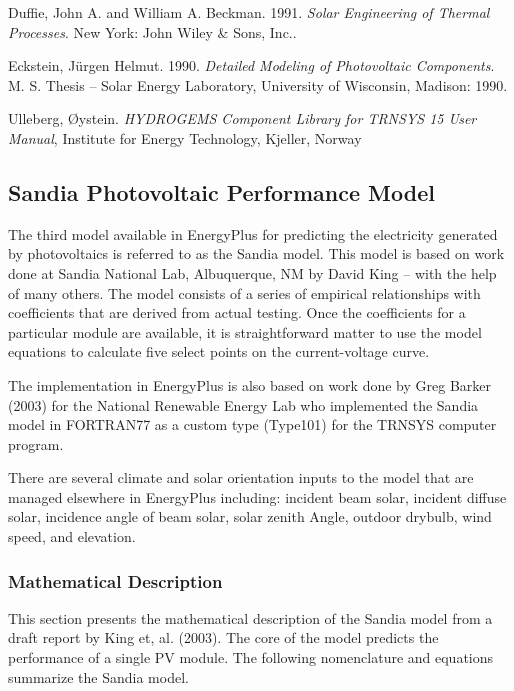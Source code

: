 Duffie, John A. and William A. Beckman. 1991. \emph{Solar Engineering of Thermal Processes}. New York: John Wiley \& Sons, Inc..

Eckstein, Jürgen Helmut. 1990. \emph{Detailed Modeling of Photovoltaic Components}. M. S. Thesis -- Solar Energy Laboratory, University of Wisconsin, Madison: 1990.

Ulleberg, Øystein. \emph{HYDROGEMS Component Library for TRNSYS 15 User Manual}, Institute for Energy Technology, Kjeller, Norway \emph{~}

\subsection{Sandia Photovoltaic Performance Model}\label{sandia-photovoltaic-performance-model}

The third model available in EnergyPlus for predicting the electricity generated by photovoltaics is referred to as the Sandia model. This model is based on work done at Sandia National Lab, Albuquerque, NM by David King -- with the help of many others. The model consists of a series of empirical relationships with coefficients that are derived from actual testing. Once the coefficients for a particular module are available, it is straightforward matter to use the model equations to calculate five select points on the current-voltage curve.

The implementation in EnergyPlus is also based on work done by Greg Barker (2003) for the National Renewable Energy Lab who implemented the Sandia model in FORTRAN77 as a custom type (Type101) for the TRNSYS computer program.

There are several climate and solar orientation inputs to the model that are managed elsewhere in EnergyPlus including: incident beam solar, incident diffuse solar, incidence angle of beam solar, solar zenith Angle, outdoor drybulb, wind speed, and elevation.

\subsubsection{Mathematical Description}\label{mathematical-description-2}

This section presents the mathematical description of the Sandia model from a draft report by King et, al. (2003). The core of the model predicts the performance of a single PV module. The following nomenclature and equations summarize the Sandia model.

